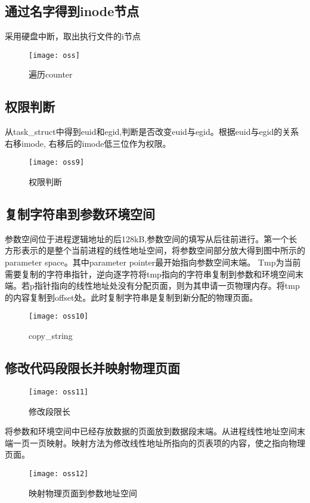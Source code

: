 \documentclass[]{report}
\begin{document}
\subsection{通过名字得到inode节点}
采用硬盘中断，取出执行文件的i节点
\begin{figure}[H]%
	\centering  %
	\texttt{[image: oss]}  
	\caption{遍历counter}  %
	\label{fig27}
\end{figure}
\subsection{权限判断}
从task\_struct中得到euid和egid,判断是否改变euid与egid。根据euid与egid的关系右移imode, 右移后的imode低三位作为权限。
\begin{figure}[H]%
	\centering  %
	\texttt{[image: oss9]}  
	\caption{权限判断}  %
	\label{fig28}
\end{figure}
\subsection{复制字符串到参数环境空间}
参数空间位于进程逻辑地址的后128kB,参数空间的填写从后往前进行。第一个长方形表示的是整个当前进程的线性地址空间，将参数空间部分放大得到图中所示的parameter space。其中parameter pointer最开始指向参数空间末端。
Tmp为当前需要复制的字符串指针，逆向逐字符将tmp指向的字符串复制到参数和环境空间末端。若p指针指向的线性地址处没有分配页面，则为其申请一页物理内存。将tmp的内容复制到offset处。此时复制字符串是复制到新分配的物理页面。
\begin{figure}[H]%
	\centering  %
	\texttt{[image: oss10]}  
	\caption{copy\_string}  %
	\label{fig29}
\end{figure}
\subsection{修改代码段限长并映射物理页面}
\begin{figure}[H]%
	\centering  %
	\texttt{[image: oss11]}  
	\caption{修改段限长}  %
	\label{fig30}
\end{figure}
将参数和环境空间中已经存放数据的页面放到数据段末端。从进程线性地址空间末端一页一页映射。映射方法为修改线性地址所指向的页表项的内容，使之指向物理页面。
\begin{figure}[H]%
	\centering  %
	\texttt{[image: oss12]}  
	\caption{映射物理页面到参数地址空间}  %
	\label{fig31}
\end{figure}
\end{document}
